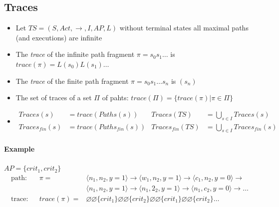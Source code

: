 \documentclass[a4paper, 10pt]{article}
\begin{document}
\subsection*{Traces}
\begin{shaded}
    \begin{itemize}
        \item Let $TS=(S,Act,\to,I,AP,L)$ without terminal states {\tiny all maximal paths (and executions) are infinite}
        \item The \emph{trace} of the infinite path fragment $\pi=s_0s_1\dots$ is $trace(\pi)=L(s_0)L(s_1)\dots$
        \item The \emph{trace} of the finite path fragment $\pi=s_0s_1\dots s_n$ is $(s_n)$
        \item The set of traces of a set $\Pi$ of pahts: $trace(\Pi)=\{ trace(\pi) | \pi\in\Pi \}$
        \item %
        \begin{align*}
        Traces(s)&=trace(Paths(s)) & Traces(TS)&=\bigcup_{s\in I} Traces(s) \\
        Traces_{fin}(s)&=trace(Paths_{fin}(s)) & Traces_{fin}(TS)&=\bigcup_{s\in I} Traces_{fin}(s)
        \end{align*}
    \end{itemize}
\end{shaded}
\paragraph*{Example}
$AP=\{ crit_1,crit_2 \}$
\begin{align*}
\textrm{path:} & & %
\pi = &
    \langle n_1,n_2,y=1 \rangle \to
    \langle w_1,n_2,y=1 \rangle \to
    \langle c_1,n_2,y=0 \rangle \to \\
    & & &
    \langle n_1,n_2,y=1 \rangle \to
    \langle n_1,2_2,y=1 \rangle \to
    \langle n_1,c_2,y=0 \rangle \to \dots \\
\textrm{trace:} & & %
trace(\pi) = &
    \varnothing\varnothing \{crit_1\}\varnothing\varnothing\{crit_2\}\varnothing\varnothing \{crit_1\}\varnothing\varnothing\{crit_2\}\dots
\end{align*}
\end{document}
